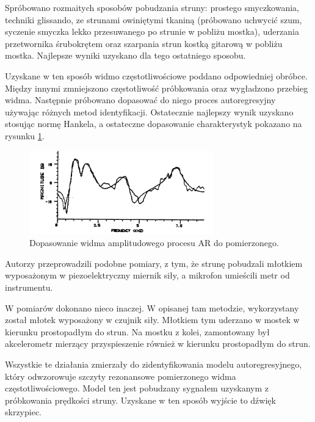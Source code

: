Spróbowano rozmaitych sposobów pobudzania struny: prostego smyczkowania, techniki glissando, ze strunami owiniętymi tkaniną (próbowano uchwycić szum, syczenie smyczka lekko przesuwanego po strunie w pobliżu mostka), uderzania przetwornika śrubokrętem oraz szarpania strun kostką gitarową w pobliżu mostka. Najlepsze wyniki uzyskano dla tego ostatniego sposobu.

Uzyskane w ten sposób widmo częstotliwościowe poddano odpowiedniej obróbce. Między innymi zmniejszono częstotliwość próbkowania oraz wygładzono przebieg widma. Następnie próbowano dopasować do niego proces autoregresyjny używając różnych metod identyfikacji. Ostatecznie najlepszy wynik uzyskano stosując normę Hankela, a ostateczne dopasowanie charakterystyk pokazano na rysunku \ref{rys:hankel}.

\begin{figure}[H]
	\centering
	\includegraphics[width=8cm]{grafiki/hankel}
	\captionsetup{justification=centering}
	\caption{Dopasowanie widma amplitudowego procesu AR do pomierzonego.}
	\label{rys:hankel}
\end{figure}

Autorzy \cite{bowed_4} przeprowadzili podobne pomiary, z tym, że strunę pobudzali młotkiem wyposażonym w piezoelektryczny miernik siły, a mikrofon umieścili metr od instrumentu.

W \cite{bowed_2} pomiarów dokonano nieco inaczej. W opisanej tam metodzie, wykorzystany został młotek wyposażony w czujnik siły. Młotkiem tym uderzano w mostek w kierunku prostopadłym do strun. Na mostku z kolei, zamontowany był akcelerometr mierzący przyspieszenie również w kierunku prostopadłym do strun.

Wszystkie te działania zmierzały do zidentyfikowania modelu autoregresyjnego, który odwzorowuje szczyty rezonansowe pomierzonego widma częstotliwościowego. Model ten jest pobudzany sygnałem uzyskanym z próbkowania prędkości struny. Uzyskane w ten sposób wyjście to dźwięk skrzypiec.

